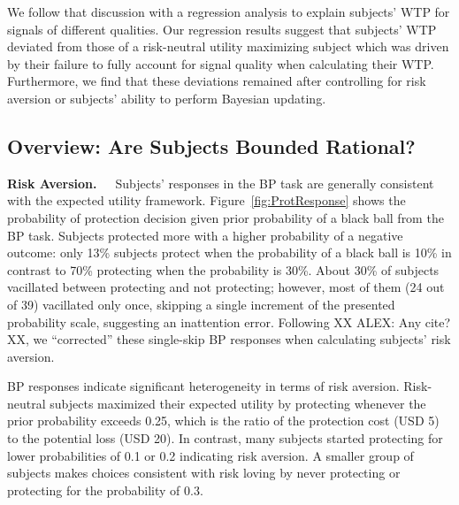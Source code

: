 \documentclass[12pt,a4paper]{article}
\newcommand{\agt}[1]{{\color{OliveGreen}#1}}
\begin{document}
We follow that discussion with a regression analysis to explain subjects’ WTP for signals of different qualities. Our regression results suggest that subjects’ WTP deviated from those of a risk-neutral utility maximizing subject which was driven by their failure to fully account for signal quality when calculating their WTP. Furthermore, we find that these deviations remained after controlling for risk aversion or subjects’ ability to perform Bayesian updating. 






\subsection{Overview: Are Subjects Bounded Rational?}


\textbf{Risk Aversion.}\ \ \ Subjects’ responses in the BP task are generally consistent with the expected utility framework. Figure~\ref{fig:ProtResponse} shows the probability of protection decision given prior probability of a black ball from the BP task. Subjects protected more with a higher probability of a negative outcome: only 13\% subjects protect when the probability of a black ball is 10\% in contrast to 70\% protecting when the probability is 30\%. 
About 30\% of subjects vacillated between protecting and not protecting; however, most of them (24 out of 39) vacillated only once, skipping a single increment of the presented probability scale, suggesting an inattention error.
Following \agt{XX ALEX: Any cite? XX}, we ``corrected'' these single-skip BP responses when calculating subjects’ risk aversion. 

BP responses indicate significant heterogeneity in terms of risk aversion. Risk-neutral subjects maximized their expected utility by protecting whenever the prior probability exceeds 0.25, which is the ratio of the protection cost (USD 5) to the potential loss (USD 20). In contrast, many subjects started protecting for lower probabilities of 0.1 or 0.2 indicating risk aversion. A smaller group of subjects makes choices consistent with risk loving by never protecting or protecting for the probability of 0.3. 
\end{document}
